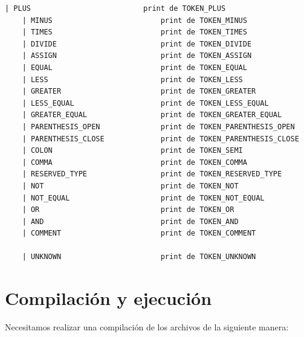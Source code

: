 \documentclass[a4paper,12pt]{article}
\begin{document}
\begin{lstlisting}[language=Eiffel, style=myeiffel]
    | PLUS                          print de TOKEN_PLUS                    -> + Lexema asociado
    | MINUS                         print de TOKEN_MINUS                   -> + Lexema asociado
    | TIMES                         print de TOKEN_TIMES                   -> + Lexema asociado
    | DIVIDE                        print de TOKEN_DIVIDE                  -> + Lexema asociado
    | ASSIGN                        print de TOKEN_ASSIGN                  -> + Lexema asociado
    | EQUAL                         print de TOKEN_EQUAL                   -> + Lexema asociado
    | LESS                          print de TOKEN_LESS                    -> + Lexema asociado
    | GREATER                       print de TOKEN_GREATER                 -> + Lexema asociado
    | LESS_EQUAL                    print de TOKEN_LESS_EQUAL              -> + Lexema asociado
    | GREATER_EQUAL                 print de TOKEN_GREATER_EQUAL           -> + Lexema asociado
    | PARENTHESIS_OPEN              print de TOKEN_PARENTHESIS_OPEN        -> + Lexema asociado
    | PARENTHESIS_CLOSE             print de TOKEN_PARENTHESIS_CLOSE       -> + Lexema asociado
    | COLON                         print de TOKEN_SEMI                    -> + Lexema asociado
    | COMMA                         print de TOKEN_COMMA                   -> + Lexema asociado
    | RESERVED_TYPE                 print de TOKEN_RESERVED_TYPE           -> + Lexema asociado
    | NOT                           print de TOKEN_NOT                     -> + Lexema asociado
    | NOT_EQUAL                     print de TOKEN_NOT_EQUAL               -> + Lexema asociado
    | OR                            print de TOKEN_OR                      -> + Lexema asociado
    | AND                           print de TOKEN_AND                     -> + Lexema asociado
    | COMMENT                       print de TOKEN_COMMENT                 -> + Lexema asociado

    | UNKNOWN                       print de TOKEN_UNKNOWN                 -> + Lexema asociado

\end{lstlisting}
\vspace{6mm}
\section{Compilación y ejecución}
\vspace{4mm}

\noindent
Necesitamos realizar una compilación de los archivos de la siguiente manera:
\end{document}
